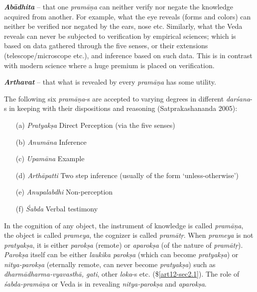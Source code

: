 {{\sl\bfseries Abādhita}\relax} -- that one {\sl pramāṇa} can neither verify nor negate the knowledge acquired from another. For example, what the eye reveals (forms and colors) can neither be veriﬁed nor negated by the ears, nose etc. Similarly, what the Veda reveals can never be subjected to veriﬁcation by empirical sciences; which is based on data gathered through the ﬁve senses, or their extensions (telescope/microscope etc.), and inference based on such data. This is in contrast with modern science where a huge premium is placed on veriﬁcation.

{{\sl\bfseries Arthavat}\relax} -- that what is revealed by every {\sl pramāṇa} has some utility. 

The following six {\sl pramāṇa}-s are accepted to varying degrees in different {\sl darśana}-s in keeping with their dispositions and reasoning (Satprakashananda 2005):
\begin{itemize}
\item[(a)] {\sl Pratyakṣa} Direct Perception (via the five senses)

\item[(b)] {\sl Anumāna} Inference

\item[(c)] {\sl Upamāna} Example

\item[(d)] {\sl Arthāpatti} Two step inference (usually of the form `unless-otherwise')

\item[(e)] {\sl Anupalabdhi} Non-perception

\item[(f)] {\sl Śabda} Verbal testimony
\end{itemize}

In the cognition of any object, the instrument of knowledge is called {\sl pramāṇa}, the object is called {\sl prameya}, the cognizer is called {\sl pramātṛ}. When {\sl prameya} is not {\sl pratyakṣa}, it is either {\sl parokṣa} (remote) or {\sl aparokṣa} (of the nature of {\sl pramātṛ}). {\sl Parokṣa} itself can be either {\sl laukika parokṣa} (which can become {\sl pratyakṣa}) or {\sl nitya-parokṣa} (eternally remote, can never become {\sl pratyakṣa}) such as {\sl dharmādharma-vyavasthā, gati}, other {\sl loka}-s etc. (\$\ref{art12-sec2.1}). The role of {\sl śabda-pramāṇa} or Veda is in revealing {\sl nitya-parokṣa} and {\sl aparokṣa}.

